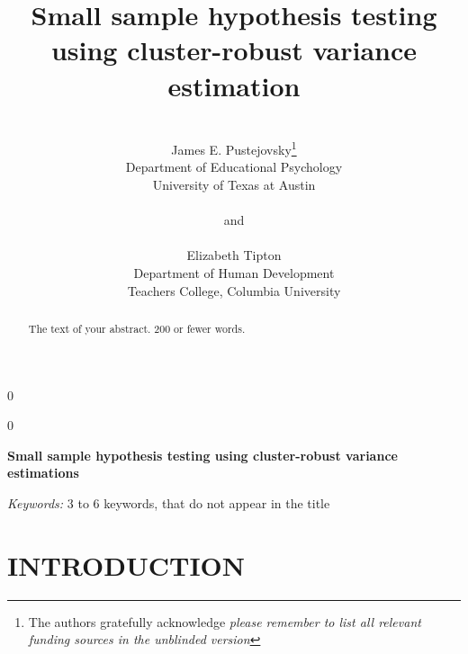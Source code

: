 \documentclass[12pt]{article}
\newcommand{\blind}{0}
\begin{document}


\def\spacingset#1{\renewcommand{\baselinestretch}%
{#1}\small\normalsize} \spacingset{1}



\blind
{
  \title{\bf Small sample hypothesis testing using cluster-robust variance estimation}
  \author{\\James E. Pustejovsky\thanks{
    The authors gratefully acknowledge \textit{please remember to list all relevant funding sources in the unblinded version}}\hspace{.2cm}\\
    Department of Educational Psychology \\ 
    University of Texas at Austin\\ \\
    and \\ \\
    Elizabeth Tipton \\
    Department of Human Development \\ 
    Teachers College, Columbia University}
  \maketitle
} \fi

\blind
{
  \bigskip
  \bigskip
  \bigskip
  \begin{center}
    {\LARGE\bf Small sample hypothesis testing using cluster-robust variance estimations}
\end{center}
  \medskip
} \fi

\bigskip
\begin{abstract}
The text of your abstract.  200 or fewer words.
\end{abstract}

\noindent%
{\it Keywords:}  3 to 6 keywords, that do not appear in the title
\vfill

\newpage
\spacingset{1.45} %

\section{INTRODUCTION}
\label{sec:intro}

\begin{Schunk}
\end{Schunk}
\end{document}
